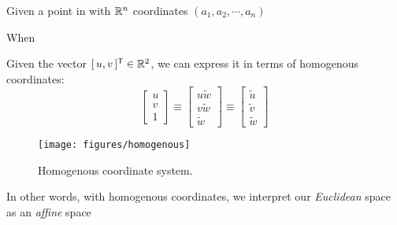 Given a point in with $\mathbb{R}^n$ coordinates $(a_1, a_2, \cdots, a_n)$

When



Given the vector $[\,u, v\,]^{\mathsf{T}} \in \mathbb{R}^2$, we can express it in terms of homogenous coordinates: 
\begin{equation}
    \begin{bmatrix}
        u \\ v \\ 1
    \end{bmatrix}
    \equiv
    \begin{bmatrix}
        u\widetilde{w} \\ v\widetilde{w} \\ \widetilde{w}
    \end{bmatrix}
    \equiv
    \begin{bmatrix}
        \widetilde{u} \\ \widetilde{v} \\ \widetilde{w}
    \end{bmatrix}
\end{equation}

\begin{figure}[H]
    \centering
    \texttt{[image: figures/homogenous]}
    \caption{Homogenous coordinate system.}
\end{figure}

In other words, with homogenous coordinates, we interpret our \emph{Euclidean} space as an \emph{affine} space
